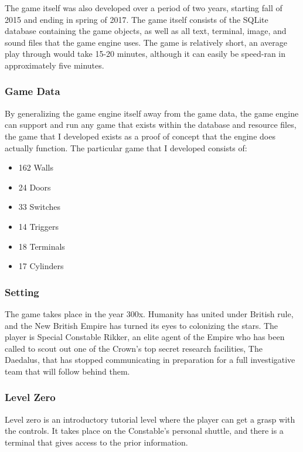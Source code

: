 \documentclass{article}
\begin{document}
The game itself was also developed over a period of two years, starting fall of 2015 and ending in spring of 2017. The game itself consists of the SQLite database containing the game objects, as well as all text, terminal, image, and sound files that the game engine uses. The game is relatively short, an average play through would take 15-20 minutes, although it can easily be speed-ran in approximately five minutes.

\subsubsection{Game Data} \label{subsubsec:gamedata}

By generalizing the game engine itself away from the game data, the game engine can support and run any game that exists within the database and resource files, the game that I developed exists as a proof of concept that the engine does actually function. The particular game that I developed consists of:

\begin{itemize}
	\item 162 Walls
	\item 24 Doors
	\item 33 Switches
	\item 14 Triggers
	\item 18 Terminals
	\item 17 Cylinders
\end{itemize}

\subsubsection{Setting} \label{subsubsec:setting}

The game takes place in the year 300x. Humanity has united under British rule, and the New British Empire has turned its eyes to colonizing the stars. The player is Special Constable Rikker, an elite agent of the Empire who has been called to scout out one of the Crown's top secret research facilities, The Daedalus, that has stopped communicating in preparation for a full investigative team that will follow behind them.

\subsubsection{Level Zero} \label{subsubsec:levelzero}

Level zero is an introductory tutorial level where the player can get a grasp with the controls. It takes place on the Constable's personal shuttle, and there is a terminal that gives access to the prior information.
\end{document}
